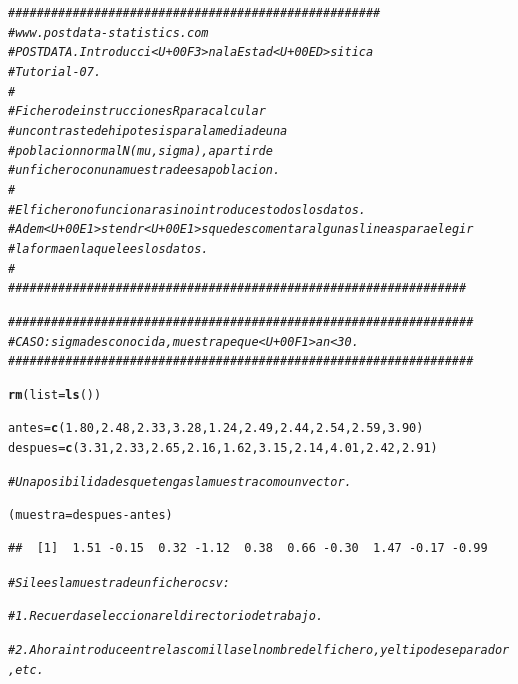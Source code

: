 \documentclass[10pt,a4paper]{article}\usepackage[]{graphicx}\usepackage[]{color}
\makeatletter
\newcommand{\hlnum}[1]{\textcolor[rgb]{0.686,0.059,0.569}{#1}}%
\newcommand{\hlcom}[1]{\textcolor[rgb]{0.678,0.584,0.686}{\textit{#1}}}%
\newcommand{\hlopt}[1]{\textcolor[rgb]{0,0,0}{#1}}%
\newcommand{\hlstd}[1]{\textcolor[rgb]{0.345,0.345,0.345}{#1}}%
\newcommand{\hlkwb}[1]{\textcolor[rgb]{0.69,0.353,0.396}{#1}}%
\newcommand{\hlkwc}[1]{\textcolor[rgb]{0.333,0.667,0.333}{#1}}%
\newcommand{\hlkwd}[1]{\textcolor[rgb]{0.737,0.353,0.396}{\textbf{#1}}}%
\newenvironment{kframe}{%
 \def\at@end@of@kframe{}%
 \ifinner\ifhmode%
  \def\at@end@of@kframe{\end{minipage}}%
  \begin{minipage}{\columnwidth}%
 \fi\fi%
 \def\FrameCommand##1{\hskip\@totalleftmargin \hskip-\fboxsep
 \colorbox{shadecolor}{##1}\hskip-\fboxsep
     \hskip-\linewidth \hskip-\@totalleftmargin \hskip\columnwidth}%
 \MakeFramed {\advance\hsize-\width
   \@totalleftmargin\z@ \linewidth\hsize
   \@setminipage}}%
 {\par\unskip\endMakeFramed%
 \at@end@of@kframe}
\newenvironment{knitrout}{}{} %
\newcounter {cont01}
\makeatother
\begin{document}
\begin{knitrout}
\color{fgcolor}\begin{kframe}
\begin{alltt}
\hlcom{####################################################}
\hlcom{# www.postdata-statistics.com}
\hlcom{# POSTDATA. Introducci<U+00F3>n a la Estad<U+00ED>sitica}
\hlcom{# Tutorial-07.}
\hlcom{#}
\hlcom{# Fichero de instrucciones R para calcular}
\hlcom{# un contraste de hipotesis para la media de una}
\hlcom{# poblacion normal N(mu,sigma), a partir de}
\hlcom{# un fichero con una muestra de esa poblacion.}
\hlcom{#}
\hlcom{# El fichero no funcionara si no introduces todos los datos.}
\hlcom{# Adem<U+00E1>s tendr<U+00E1>s que descomentar algunas lineas para elegir}
\hlcom{# la forma en la que lees los datos.}
\hlcom{#}
\hlcom{################################################################}


\hlcom{#################################################################}
\hlcom{# CASO:  sigma desconocida, muestra peque<U+00F1>a  n<30.}
\hlcom{#################################################################}

\hlkwd{rm}\hlstd{(}\hlkwc{list} \hlstd{=} \hlkwd{ls}\hlstd{())}

\hlstd{antes} \hlkwb{=} \hlkwd{c}\hlstd{(}\hlnum{1.80}\hlstd{,} \hlnum{2.48}\hlstd{,} \hlnum{2.33}\hlstd{,} \hlnum{3.28}\hlstd{,} \hlnum{1.24}\hlstd{,} \hlnum{2.49}\hlstd{,} \hlnum{2.44}\hlstd{,} \hlnum{2.54}\hlstd{,} \hlnum{2.59}\hlstd{,} \hlnum{3.90}\hlstd{)}
\hlstd{despues} \hlkwb{=} \hlkwd{c}\hlstd{(}\hlnum{3.31}\hlstd{,} \hlnum{2.33}\hlstd{,} \hlnum{2.65}\hlstd{,} \hlnum{2.16}\hlstd{,} \hlnum{1.62}\hlstd{,} \hlnum{3.15}\hlstd{,} \hlnum{2.14}\hlstd{,} \hlnum{4.01}\hlstd{,} \hlnum{2.42}\hlstd{,} \hlnum{2.91}\hlstd{)}

\hlcom{# Una posibilidad es que tengas la muestra como un vector.}

\hlstd{(muestra} \hlkwb{=} \hlstd{despues} \hlopt{-} \hlstd{antes)}
\end{alltt}
\begin{verbatim}
##  [1]  1.51 -0.15  0.32 -1.12  0.38  0.66 -0.30  1.47 -0.17 -0.99
\end{verbatim}
\begin{alltt}
\hlcom{# Si lees la muestra de un fichero csv:}

\hlcom{# 1. Recuerda seleccionar el directorio de trabajo.}

\hlcom{# 2. Ahora introduce entre las comillas el nombre del fichero, y el tipo de separador, etc.}


\end{alltt}
\end{kframe}
\end{knitrout}
\end{document}
